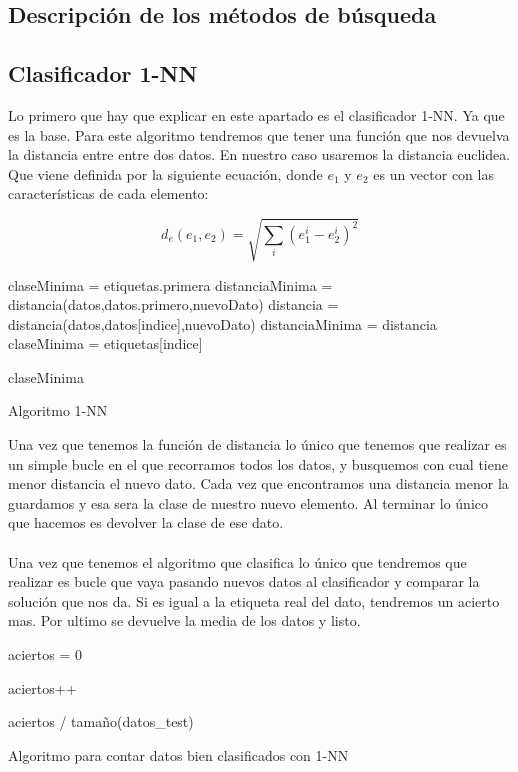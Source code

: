 \documentclass[12pt,a4paper]{article}
\begin{document}
\subsection{Descripción de los métodos de búsqueda}
\subsection{Clasificador 1-NN}
Lo primero que hay que explicar en este apartado es el clasificador 1-NN. Ya que es la base. Para este  algoritmo tendremos que tener una función que nos devuelva la distancia entre  entre dos datos. En nuestro caso usaremos la distancia euclidea. Que viene definida por la siguiente ecuación, donde $e_{1} $ y $e_{2}$ es un vector con las características de cada elemento:

\[ d_{e}\left(e_{1}, e_{2}\right)=\sqrt{\sum_{i}\left(e_{1}^{i}-e_{2}^{i}\right)^{2}} \]
\begin{algorithm}[H]
	\begin{algorithmic}[1]
		\State 	claseMinima = etiquetas.primera
		\State distanciaMinima = distancia(datos,datos.primero,nuevoDato)
		\State distancia = distancia(datos,datos[indice],nuevoDato)
		\State distanciaMinima = distancia
		\State claseMinima = etiquetas[indice]
		\EndIf %
		\EndFor
		
		\State \Return claseMinima
		
	\end{algorithmic}
	\label{alg:knn}
	\caption{Algoritmo 1-NN}
\end{algorithm}
Una vez que tenemos la función de distancia lo único que tenemos que realizar es un simple bucle en el que recorramos todos los datos, y busquemos con cual tiene menor distancia el  nuevo dato. Cada vez que encontramos una distancia menor la guardamos y esa sera la clase de nuestro nuevo elemento. Al terminar lo único que hacemos es devolver la clase de ese dato. \\\\

Una vez que tenemos el algoritmo que clasifica lo único que tendremos que realizar es bucle que vaya pasando nuevos datos al clasificador y comparar la solución que nos da. Si es igual a la etiqueta real del dato, tendremos un acierto mas. Por ultimo se devuelve la media de los datos y listo.
\begin{algorithm}[H]
	\begin{algorithmic}[1]
		\State 	aciertos = 0
		
		\State aciertos++
		\EndIf %
		
		
		\EndFor
		
		\State \Return aciertos / tamaño(datos\_test)
		
	\end{algorithmic}
	\label{alg:knncount}
	\caption{Algoritmo para contar datos bien clasificados con 1-NN}
\end{algorithm}
\end{document}
